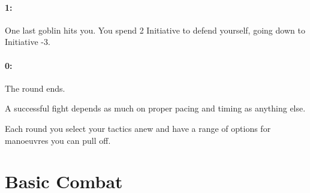 {\begin{multicols}{2}
\paragraph{1:} One last goblin hits you.
You spend 2 Initiative to defend yourself, going down to Initiative -3.
\paragraph{0:} The round ends.

\vspace{1em}

A successful fight depends as much on proper pacing and timing as anything else.

Each \gls{round} you select your tactics anew and have a range of options for manoeuvres you can pull off.

\end{multicols}

}{}
\section{Basic Combat}

